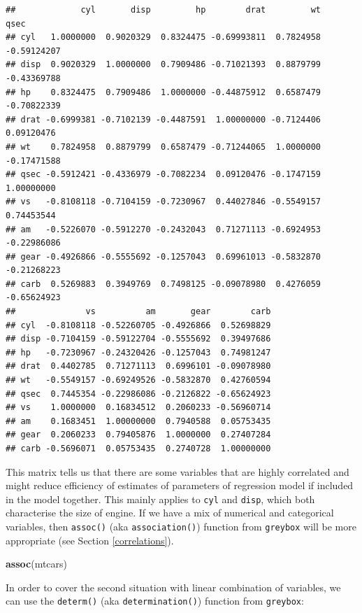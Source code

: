 \documentclass[
]{book}
\newenvironment{Shaded}{\begin{snugshade}}{\end{snugshade}}
\newcommand{\KeywordTok}[1]{\textcolor[rgb]{0.13,0.29,0.53}{\textbf{#1}}}
\newcommand{\NormalTok}[1]{#1}
\theoremstyle{definition}
\theoremstyle{definition}
\theoremstyle{definition}
\theoremstyle{definition}
\theoremstyle{remark}
\begin{document}
\begin{verbatim}
##             cyl       disp         hp        drat         wt        qsec
## cyl   1.0000000  0.9020329  0.8324475 -0.69993811  0.7824958 -0.59124207
## disp  0.9020329  1.0000000  0.7909486 -0.71021393  0.8879799 -0.43369788
## hp    0.8324475  0.7909486  1.0000000 -0.44875912  0.6587479 -0.70822339
## drat -0.6999381 -0.7102139 -0.4487591  1.00000000 -0.7124406  0.09120476
## wt    0.7824958  0.8879799  0.6587479 -0.71244065  1.0000000 -0.17471588
## qsec -0.5912421 -0.4336979 -0.7082234  0.09120476 -0.1747159  1.00000000
## vs   -0.8108118 -0.7104159 -0.7230967  0.44027846 -0.5549157  0.74453544
## am   -0.5226070 -0.5912270 -0.2432043  0.71271113 -0.6924953 -0.22986086
## gear -0.4926866 -0.5555692 -0.1257043  0.69961013 -0.5832870 -0.21268223
## carb  0.5269883  0.3949769  0.7498125 -0.09078980  0.4276059 -0.65624923
##              vs          am       gear        carb
## cyl  -0.8108118 -0.52260705 -0.4926866  0.52698829
## disp -0.7104159 -0.59122704 -0.5555692  0.39497686
## hp   -0.7230967 -0.24320426 -0.1257043  0.74981247
## drat  0.4402785  0.71271113  0.6996101 -0.09078980
## wt   -0.5549157 -0.69249526 -0.5832870  0.42760594
## qsec  0.7445354 -0.22986086 -0.2126822 -0.65624923
## vs    1.0000000  0.16834512  0.2060233 -0.56960714
## am    0.1683451  1.00000000  0.7940588  0.05753435
## gear  0.2060233  0.79405876  1.0000000  0.27407284
## carb -0.5696071  0.05753435  0.2740728  1.00000000
\end{verbatim}

This matrix tells us that there are some variables that are highly correlated and might reduce efficiency of estimates of parameters of regression model if included in the model together. This mainly applies to \texttt{cyl} and \texttt{disp}, which both characterise the size of engine. If we have a mix of numerical and categorical variables, then \texttt{assoc()} (aka \texttt{association()}) function from \texttt{greybox} will be more appropriate (see Section \ref{correlations}).

\begin{Shaded}
\begin{Highlighting}[]
\KeywordTok{assoc}\NormalTok{(mtcars)}
\end{Highlighting}
\end{Shaded}

In order to cover the second situation with linear combination of variables, we can use the \texttt{determ()} (aka \texttt{determination()}) function from \texttt{greybox}:
\end{document}
